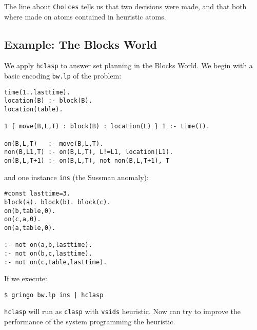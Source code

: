  The line about \texttt{Choices} tells us that  two decisions were made, and that both where made on atoms contained in heuristic atoms. 


\subsection{Example: The Blocks World}

 We apply \texttt{hclasp} to answer set planning in the Blocks World.  We begin with a basic encoding \texttt{bw.lp} of the problem: 
\begin{verbatim}
time(1..lasttime).                                                                                                                                                                                         
location(B) :- block(B).                                                                                            
location(table).                                                                                                    
                                                                                                                    
1 { move(B,L,T) : block(B) : location(L) } 1 :- time(T).                                           
                                                                                                                    
on(B,L,T)   :- move(B,L,T).                                                                             
non(B,L1,T) :- on(B,L,T), L!=L1, location(L1). 
on(B,L,T+1) :- on(B,L,T), not non(B,L,T+1), T \end{verbatim}

 and one instance \texttt{ins} (the Sussman anomaly): 
\begin{verbatim}
#const lasttime=3.
block(a). block(b). block(c).
on(b,table,0). 
on(c,a,0).
on(a,table,0).

:- not on(a,b,lasttime).
:- not on(b,c,lasttime).
:- not on(c,table,lasttime).
\end{verbatim}

If we execute:
\begin{verbatim}
$ gringo bw.lp ins | hclasp\end{verbatim}

\texttt{hclasp} will run as \texttt{clasp} with \texttt{vsids} heuristic. Now can try to improve the performance of the system programming the heuristic. 

